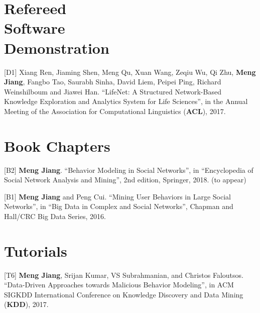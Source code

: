 \documentclass[margin, 9pt]{res}
\begin{document}
\begin{resume}

\section{Refereed \\ Software \\ Demonstration}

[D1] Xiang Ren, Jiaming Shen, Meng Qu, Xuan Wang, Zeqiu Wu, Qi Zhu, \textbf{Meng Jiang}, Fangbo Tao, Saurabh Sinha, David Liem, Peipei Ping, Richard Weinshilboum and Jiawei Han. ``LifeNet: A Structured Network-Based Knowledge Exploration and Analytics System for Life Sciences'', in the Annual Meeting of the Association for Computational Linguistics (\textbf{ACL}), 2017.


\section{Book Chapters}

[B2] \textbf{Meng Jiang}. ``Behavior Modeling in Social Networks'', in ``Encyclopedia of Social Network Analysis and Mining'', 2nd edition, Springer, 2018. (to appear)

[B1] \textbf{Meng Jiang} and Peng Cui. ``Mining User Behaviors in Large Social Networks'', in ``Big Data in Complex and Social Networks'', Chapman and Hall/CRC Big Data Series, 2016.


\section{Tutorials}

[T6] \textbf{Meng Jiang}, Srijan Kumar, VS Subrahmanian, and Christos Faloutsos. ``Data-Driven Approaches towards Malicious Behavior Modeling'', in ACM SIGKDD International Conference on Knowledge Discovery and Data Mining (\textbf{KDD}), 2017.


\end{resume}
\end{document}
